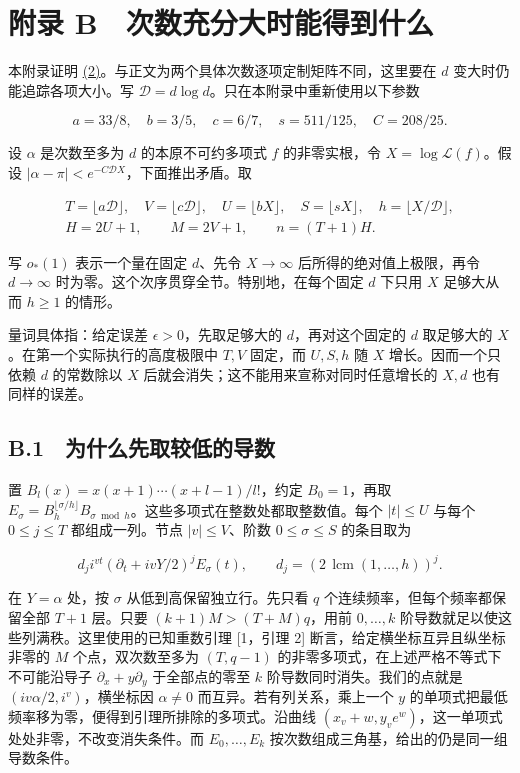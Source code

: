 \documentclass[11pt,a4paper]{article}
\begin{document}
\section{附录 B　次数充分大时能得到什么}\label{ux9644ux5f55-b-ux6b21ux6570ux5145ux5206ux5927ux65f6ux80fdux5f97ux5230ux4ec0ux4e48}

本附录证明 \hyperref[eq:2]{(2)}。与正文为两个具体次数逐项定制矩阵不同，这里要在 \(d\) 变大时仍能追踪各项大小。写 \(\mathscr D=d\log d\)。只在本附录中重新使用以下参数

\[
 a=33/8,\quad b=3/5,\quad c=6/7,\quad s=511/125,\quad C=208/25 .
\]

设 \(\alpha\) 是次数至多为 \(d\) 的本原不可约多项式 \(f\) 的非零实根，令 \(X=\log\mathcal L(f)\)。假设 \(|\alpha-\pi|<e^{-C\mathscr D X}\)，下面推出矛盾。取

\[
 \begin{gathered}
 T=\lfloor a\mathscr D\rfloor,\quad V=\lfloor c\mathscr D\rfloor,\quad
 U=\lfloor bX\rfloor,\quad S=\lfloor sX\rfloor,\quad h=\lfloor X/\mathscr D\rfloor,\\
 H=2U+1,\qquad M=2V+1,\qquad n=(T+1)H .
 \end{gathered}
\]

写 \(o_*(1)\) 表示一个量在固定 \(d\)、先令 \(X\to\infty\) 后所得的绝对值上极限，再令 \(d\to\infty\) 时为零。这个次序贯穿全节。特别地，在每个固定 \(d\) 下只用 \(X\) 足够大从而 \(h\ge1\) 的情形。

量词具体指：给定误差 \(\epsilon>0\)，先取足够大的 \(d\)，再对这个固定的 \(d\) 取足够大的 \(X\)。在第一个实际执行的高度极限中 \(T,V\) 固定，而 \(U,S,h\) 随 \(X\) 增长。因而一个只依赖 \(d\) 的常数除以 \(X\) 后就会消失；这不能用来宣称对同时任意增长的 \(X,d\) 也有同样的误差。

\subsection{B.1　为什么先取较低的导数}\label{b.1-ux4e3aux4ec0ux4e48ux5148ux53d6ux8f83ux4f4eux7684ux5bfcux6570}

置 \(B_l(x)=x(x+1)\cdots(x+l-1)/l!\)，约定 \(B_0=1\)，再取 \(E_\sigma=B_h^{\lfloor\sigma/h\rfloor}B_{\sigma\bmod h}\)。这些多项式在整数处都取整数值。每个 \(|t|\le U\) 与每个 \(0\le j\le T\) 都组成一列。节点 \(|v|\le V\)、阶数 \(0\le\sigma\le S\) 的条目取为

\[
 d_j i^{vt}(\partial_t+ivY/2)^jE_\sigma(t),\qquad
 d_j=(2\,\operatorname{lcm}(1,\ldots,h))^j .                              \tag{28}\label{eq:28}
\]

在 \(Y=\alpha\) 处，按 \(\sigma\) 从低到高保留独立行。先只看 \(q\) 个连续频率，但每个频率都保留全部 \(T+1\) 层。只要 \((k+1)M>(T+M)q\)，用前 \(0,\ldots,k\) 阶导数就足以使这些列满秩。这里使用的已知重数引理 {[}1，引理 2{]} 断言，给定横坐标互异且纵坐标非零的 \(M\) 个点，双次数至多为 \((T,q-1)\) 的非零多项式，在上述严格不等式下不可能沿导子 \(\partial_x+y\partial_y\) 于全部点的零至 \(k\) 阶导数同时消失。我们的点就是 \((iv\alpha/2,i^v)\)，横坐标因 \(\alpha\ne0\) 而互异。若有列关系，乘上一个 \(y\) 的单项式把最低频率移为零，便得到引理所排除的多项式。沿曲线 \((x_v+w,y_ve^w)\)，这一单项式处处非零，不改变消失条件。而 \(E_0,\ldots,E_k\) 按次数组成三角基，给出的仍是同一组导数条件。
\end{document}
